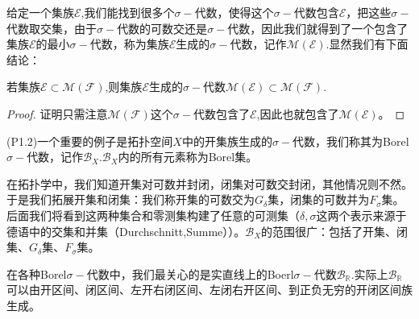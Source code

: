\documentclass[lang=cn,10pt]{elegantbook}
\begin{document}
	给定一个集族\(\mathcal{E}\),我们能找到很多个\(\sigma-\)代数，使得这个\(\sigma-\)代数包含\(\mathcal{E}\)，把这些\(\sigma-\)代数取交集，由于\(\sigma-\)代数的可数交还是\(\sigma-\)代数，因此我们就得到了一个包含了集族\(\mathcal{E}\)的最小\(\sigma-\)代数，称为集族\(\mathcal{E}\)生成的\(\sigma-\)代数，记作\(\mathcal{M}(\mathcal{E})\).显然我们有下面结论：
	\begin{proposition}[(L1.1)]
		若集族\(\mathcal{E}\subset \mathcal{M}(\mathcal{F})\),则集族\(\mathcal{E}\)生成的\(\sigma-\)代数\(\mathcal{M}(\mathcal{E})\subset \mathcal{M}(\mathcal{F}).\)
	\end{proposition}
	\begin{proof}
		证明只需注意\(\mathcal{M}(\mathcal{F})\)这个\(\sigma-\)代数包含了\(\mathcal{E}\),因此也就包含了\(\mathcal{M}(\mathcal{E})\)。
	\end{proof}
	(P1.2)一个重要的例子是拓扑空间\(X\)中的开集族生成的\(\sigma-\)代数，我们称其为Borel\(\sigma-\)代数，记作\(\mathcal{B}_X\).\(\mathcal{B}_X\)内的所有元素称为Borel集。

	在拓扑学中，我们知道开集对可数并封闭，闭集对可数交封闭，其他情况则不然。于是我们拓展开集和闭集：我们称开集的可数交为\(G_\delta\)集，闭集的可数并为\(F_\sigma\)集。后面我们将看到这两种集合和零测集构建了任意的可测集（\(\delta,\sigma\)这两个表示来源于德语中的交集和并集（Durchschnitt,Summe））。\(\mathcal{B}_X\)的范围很广：包括了开集、闭集、\(G_\delta\)集、\(F_\sigma\)集。

	在各种Borel\(\sigma-\)代数中，我们最关心的是实直线上的Boerl\(\sigma-\)代数\(\mathcal{B}_\mathbb{R}\).实际上\(\mathcal{B}_\mathbb{R}\)可以由开区间、闭区间、左开右闭区间、左闭右开区间、到正负无穷的开闭区间族生成。
\end{document}
